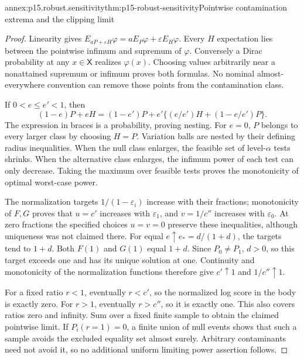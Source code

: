 \begin{annexitem}{annex:p15.robust.sensitivity}{thm:p15-robust-sensitivity}{Pointwise contamination extrema and the clipping limit}
\begin{proof}
Linearity gives \(E_{aP+\varepsilon H}\varphi=aE_P\varphi+
\varepsilon E_H\varphi\). Every \(H\) expectation lies between the
pointwise infimum and supremum of \(\varphi\).
Conversely a Dirac probability at any \(x\in\mathsf X\) realizes
\(\varphi(x)\). Choosing values arbitrarily near a nonattained
supremum or infimum proves both formulas.
No nominal almost-everywhere convention can remove those points
from the contamination class.

If \(0<e\leq e'<1\), then
\[
 (1-e)P+eH=(1-e')P+
 e'\{(e/e')H+(1-e/e')P\}.
\]
The expression in braces is a probability, proving nesting.
For \(e=0\), \(P\) belongs to every larger class by choosing \(H=P\).
Variation balls are nested by their defining radius inequalities.
When the null class enlarges, the feasible set of level-\(\alpha\)
tests shrinks. When the alternative class enlarges, the infimum power
of each test can only decrease. Taking the maximum over feasible
tests proves the monotonicity of optimal worst-case power.

The normalization targets \(1/(1-\varepsilon_i)\) increase with their
fractions; monotonicity of \(F,G\) proves that \(u=c'\) increases with
\(\varepsilon_1\), and \(v=1/c''\) increases with \(\varepsilon_0\).
At zero fractions the specified choices \(u=v=0\) preserve these
inequalities, although uniqueness was not claimed there.
For equal \(e\uparrow e_*=d/(1+d)\), the targets tend to \(1+d\).
Both \(F(1)\) and \(G(1)\) equal \(1+d\). Since \(P_0\ne P_1\),
\(d>0\), so this target exceeds one and has its unique solution at one.
Continuity and monotonicity of the normalization functions therefore
give \(c'\uparrow1\) and \(1/c''\uparrow1\).

For a fixed ratio \(r<1\), eventually \(r<c'\), so the normalized
log score in the body is exactly zero. For \(r>1\), eventually
\(r>c''\), so it is exactly one. This also covers ratios zero and
infinity. Sum over a fixed finite sample to obtain the claimed
pointwise limit. If \(P_i(r=1)=0\), a finite union of null events
shows that such a sample avoids the excluded equality set almost
surely. Arbitrary contaminants need not avoid it, so no additional
uniform limiting power assertion follows.
\end{proof}
\end{annexitem}

